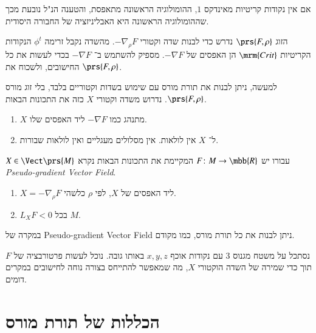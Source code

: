 \documentclass[a4paper,10pt,twoside,openany]{book}
\begin{document}
\begin{remark}
אם אין נקודות קריטיות מאינדקס
$1$,
ההומולוגיה הראשונה מתאפסת, והטענה הנ"ל נובעת מכך שההומולוגיה הראשונה היא האבליניזציה של החבורה היסודית.
\end{remark}

\begin{remark}
הזוג
$\prs{F,\rho}$
נדרש כדי לבנות שדה וקטורי
$-\nabla_\rho F$.
מהשדה נקבל זרימה
$\phi^t$
 הנקודות הקריטיות
$\mrm{Crit}$
הן האפסים של
$-\nabla F$.
מספיק להשתמש ב־%
$- \nabla F$
בכדי לעשות את כל החישובים, ולשכוח את
$\prs{F, \rho}$.

למעשה, ניתן לבנות את תורת מורס עם שימוש בשדות וקטוריים בלבד, בלי זוג מורס
$\prs{F, \rho}$.
נדרוש משדה וקטורי
$X$
כזה את התכונות הבאות.
\begin{enumerate}[label = (\roman*)]
\item%
$X$
מתנהג כמו
$-\nabla F$
ליד האפסים שלו.
\item%
ל־%
$X$
אין לולאות. אין מסלולים מעגליים ואין לולאות שבורות.
\end{enumerate}
\end{remark}

\begin{definition}
$X \in \Vect\prs{M}$
עבורו יש
$F \colon M \to \mbb{R}$
המקיימת את התכונות הבאות נקרא
\emph{\textenglish{Pseudo-gradient Vector Field}}.
\begin{enumerate}[label = (\roman*)]
\item $X = -\nabla_\rho F$
ליד האפסים של
$X$,
לפי
$\rho$
כלשהי.
\item $L_X F < 0$
בכל
$M$.
\end{enumerate}
\end{definition}

במקרה של
\textenglish{Pseudo-gradient Vector Field}
ניתן לבנות את כל תורת מורס, כמו מקודם.

\begin{example}
נסתכל על משטח מגנוס
$3$
עם נקודות אוכף
$x,y,z$
באותו גובה.
נוכל לעשות פרטורבציה של
$F$
תוך כדי שמירה של השדה הוקטורי
$X$,
מה שמאפשר להתייחס בצורה נוחה לחישובים במקרים דומים.
\end{example}

\section{הכללות של תורת מורס}
\end{document}
